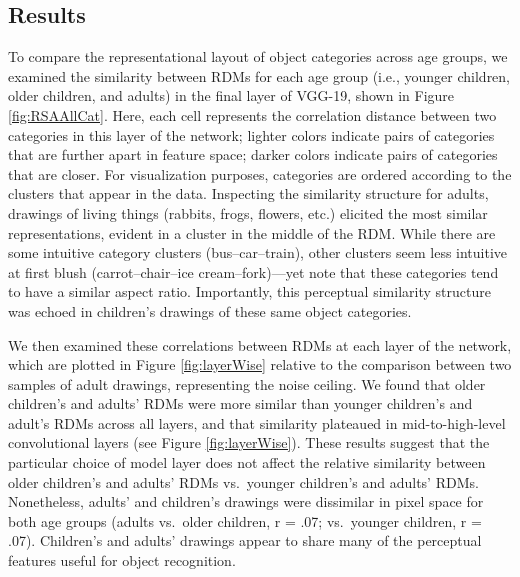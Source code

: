 \documentclass[10pt, letterpaper]{article}
\begin{document}
\subsection{Results}\label{results-1}

To compare the representational layout of object categories across age
groups, we examined the similarity between RDMs for each age group
(i.e., younger children, older children, and adults) in the final layer
of VGG-19, shown in Figure \ref{fig:RSAAllCat}. Here, each cell
represents the correlation distance between two categories in this layer
of the network; lighter colors indicate pairs of categories that are
further apart in feature space; darker colors indicate pairs of
categories that are closer. For visualization purposes, categories are
ordered according to the clusters that appear in the data. Inspecting
the similarity structure for adults, drawings of living things (rabbits,
frogs, flowers, etc.) elicited the most similar representations, evident
in a cluster in the middle of the RDM. While there are some intuitive
category clusters (bus--car--train), other clusters seem less intuitive
at first blush (carrot--chair--ice cream--fork)---yet note that these
categories tend to have a similar aspect ratio. Importantly, this
perceptual similarity structure was echoed in children's drawings of
these same object categories.

We then examined these correlations between RDMs at each layer of the
network, which are plotted in Figure \ref{fig:layerWise} relative to the
comparison between two samples of adult drawings, representing the noise
ceiling. We found that older children's and adults' RDMs were more
similar than younger children's and adult's RDMs across all layers, and
that similarity plateaued in mid-to-high-level convolutional layers (see
Figure \ref{fig:layerWise}). These results suggest that the particular
choice of model layer does not affect the relative similarity between
older children's and adults' RDMs vs.~younger children's and adults'
RDMs. Nonetheless, adults' and children's drawings were dissimilar in
pixel space for both age groups (adults vs.~older children, r = .07;
vs.~younger children, r = .07). Children's and adults' drawings appear
to share many of the perceptual features useful for object recognition.
\end{document}
